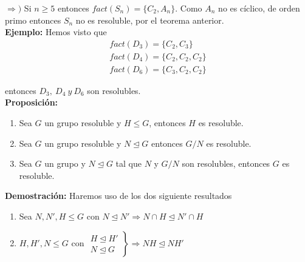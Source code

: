 \documentclass{article}
\begin{document}
$\Rightarrow)$ Si $n\geq 5$ entonces $fact(S_n)=\{C_2,A_n\}$. Como $A_n$ no es cíclico, de orden primo entonces $S_n$ no es resoluble, por el teorema anterior. \\

\textbf{Ejemplo:} Hemos visto que
\begin{gather*}
fact(D_3)=\{C_2,C_3\} \\
fact(D_4)=\{C_2,C_2,C_2\} \\
fact(D_6)=\{C_3,C_2,C_2\}
\end{gather*}

entonces $D_3,\:D_4\:y\:D_6$ son resolubles. \\

\textbf{Proposición:}\begin{enumerate}[1)]
\item Sea $G$ un grupo resoluble y $H\leq G$, entonces $H$ es resoluble.

\item Sea $G$ un grupo resoluble y $N\unlhd G$ entonces $G/N$ es resoluble.

\item Sea $G$ un grupo y $N\unlhd G$ tal que $N$ y $G/N$ son resolubles, entonces $G$ es resoluble.
\end{enumerate}

\textbf{Demostración:} Haremos uso de los dos siguiente resultados
\begin{enumerate}[\bfseries (a)]
\item Sea $N,N',H\leq G$ con $N\unlhd N'\Rightarrow N\cap H\unlhd N'\cap H$

\item $H,H',N\leq G$ con $\left.\begin{array}{c}
H\unlhd H'\\
N\unlhd G
\end{array} \right\rbrace\Rightarrow NH\unlhd NH'$
\end{enumerate}
\end{document}
